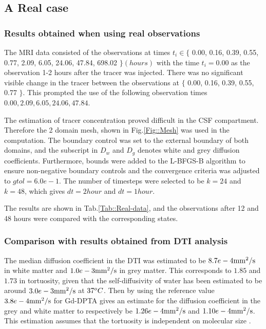 \documentclass[11pt,a4paper]{article}
\begin{document}
\subsection{A Real case} 

\subsubsection{Results obtained when using real observations}
The MRI data consisted of the observations at times $t_i \in \lbrace$ 0.00, 0.16, 0.39, 0.55, 0.77, 2.09, 6.05, 24.06, 47.84, 698.02 $\rbrace (hours)$ with the time $t_i=0.00$ as the observation 1-2 hours after the tracer was injected. There was no significant visible change in the tracer between the observations at $\lbrace $ 0.00, 0.16, 0.39, 0.55, 0.77 $ \rbrace$. This prompted the use of the following observation times  $0.00, 2.09, 6.05, 24.06, 47.84$. 

The estimation of tracer concentration proved difficult in the CSF compartment. Therefore the 2 domain mesh, shown in Fig.\ref{Fig::Mesh} was used in the computation. The boundary control was set to the external boundary of both domains, and the subscript in $D_w$ and $D_g$ denotes white and grey diffusion coefficients. Furthermore, bounds were added to the L-BFGS-B algorithm to ensure non-negative boundary controls and the convergence criteria was adjusted to $gtol=6.0e-1$. The number of timesteps were selected to be $k=24$ and $k=48$, which gives $dt = 2 hour$ and $dt = 1 hour$.   

The results are shown in Tab.\ref{Tab::Real-data}, and the observations after 12 and 48 hours were compared with the corresponding states. 
 

\subsubsection{Comparison with results obtained from DTI analysis}


The median diffusion coefficient in the DTI was estimated to be $8.7e-4 \mathrm{mm\sp{2}/s}$ in white matter and $1.0e-3 \mathrm{mm\sp{2}/s}$ in grey matter. This corresponds to $1.85$ and $1.73$ in tortuosity, given that the self-diffusivity of water has been estimated to be around $3.0e-3\mathrm{mm\sp{2}/s}$ at $37\sp{o}C$.%
Then by using the reference value $3.8e-4 \mathrm{mm\sp{2}/s}$ for Gd-DPTA gives an estimate for the diffusion coefficient in the grey and white matter to respectively be $ 1.26e-4\mathrm{mm\sp{2}/s}$ and $1.10e-4 \mathrm{mm\sp{2}/s}$. This estimation assumes that the tortuosity is independent on molecular size . 
\end{document}
